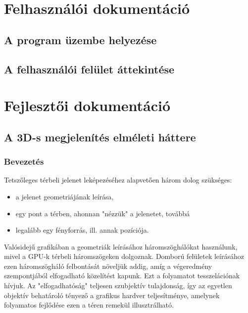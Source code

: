 \documentclass[12pt,oneside]{book}
\begin{document}

\chapter{Felhasználói dokumentáció}
\section{A program üzembe helyezése}
\section{A felhasználói felület áttekintése}


\chapter{Fejlesztői dokumentáció}

\section{A 3D-s megjelenítés elméleti háttere}

\subsection{Bevezetés}

Tetszőleges térbeli jelenet leképezéséhez alapvetően három dolog szükséges:

\begin{itemize}[noitemsep]
\item a jelenet geometriájának leírása,
\item egy pont a térben, ahonnan "nézzük" a jelenetet, továbbá
\item legalább egy fényforrás, ill. annak pozíciója.
\end{itemize}

Valósidejű grafikában a geometriák leírásához háromszöghálókat használunk, mivel a GPU-k térbeli háromszögeken dolgoznak. Domború felületek leírásához ezen háromszögháló felbontását növeljük addig, amíg a végeredmény szempontjából elfogadható közelítést kapunk. Ezt a folyamatot tesszelációnak hívjuk. Az "elfogadhatóság" teljesen szubjektív tulajdonság, így az egyetlen objektív behatároló tényező a grafikus hardver teljesítménye, amelynek folyamatos fejlődése ezen a téren remekül illusztrálható.

\end{document}

